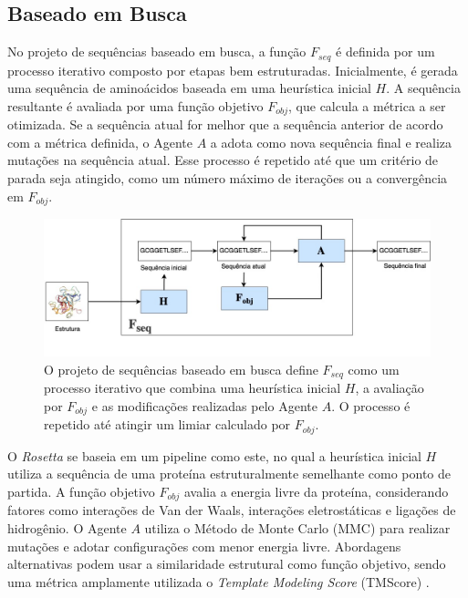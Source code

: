 \subsection{Baseado em Busca}

No projeto de sequências baseado em busca, 
a função $F_{seq}$ é definida por um processo iterativo 
composto por etapas bem estruturadas.
Inicialmente, é gerada uma sequência de aminoácidos baseada em uma heurística inicial $H$. 
A sequência resultante é avaliada por uma função objetivo $F_{obj}$, 
que calcula a métrica a ser otimizada. 
Se a sequência atual for melhor que a sequência anterior de acordo com a métrica definida, 
o Agente $A$ a adota como nova sequência final e realiza mutações na sequência atual. 
Esse processo é repetido até que um critério de parada seja atingido, 
como um número máximo de iterações ou a convergência em $F_{obj}$.


\begin{figure}[H]
  \centering
  \includegraphics[width=.8\textwidth]{figuras/metodologia-SearchBased.jpg}
  \caption{O projeto de sequências baseado em busca define $F_{seq}$ como um processo iterativo que combina uma 
           heurística inicial $H$, a avaliação por $F_{obj}$ e as modificações realizadas pelo Agente $A$. O processo é repetido até atingir um limiar calculado por $F_{obj}$.}
  \label{fig:seqdes_search_based}
\end{figure}

O \textit{Rosetta} \cite{Rosetta} se baseia em um pipeline como este, 
no qual a heurística inicial $H$ utiliza a sequência de uma proteína
estruturalmente semelhante como ponto de partida. 
A função objetivo $F_{obj}$ avalia a energia livre da proteína,
considerando fatores como interações de Van der Waals,
interações eletrostáticas e ligações de hidrogênio.
O Agente $A$ utiliza o Método de Monte Carlo (MMC) para realizar mutações
e adotar configurações com menor energia livre.
Abordagens alternativas podem usar a similaridade estrutural como função objetivo,
sendo uma métrica amplamente utilizada o \textit{Template Modeling Score} (TMScore) \cite{tmscore}.

